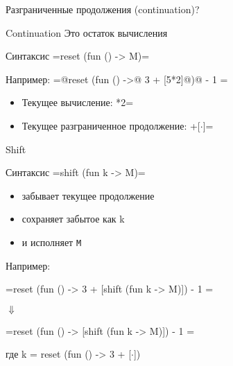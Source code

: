 \documentclass{beamer}
\begin{document}
\begin{frame}[fragile]{Разграниченные продолжения (continuation)?}
\begin{block}{Continuation}
Это остаток вычисления
\end{block}
\begin{alertblock}{Синтаксис} 
\camline=reset (fun () -> M)=
\end{alertblock}

Например: \camline=@reset (fun () ->@ 3 + [5*2]@)@ - 1 =
\begin{itemize}
 \item Текущее вычисление: *2=
 \item Текущее разграниченное продолжение: +[$\cdot$]=
\end{itemize}
\end{frame}

\begin{frame}[fragile]{Shift}
\begin{alertblock}{Синтаксис} 
\camline=shift (fun k -> M)=
\end{alertblock}
\begin{itemize}
 \item забывает текущее продолжение
 \item сохраняет забытое как k
 \item и исполняет \verb=M=
\end{itemize}

Например: 
\begin{center}
\camline=reset (fun () -> 3 + [shift (fun k -> M)]) - 1 =

{\Large $\Downarrow$}

\camline=reset (fun () -> [shift (fun k -> M)]) - 1 =

где k = reset (fun () -> 3 + [$\cdot$])
\end{center}

\end{frame}
\end{document}

